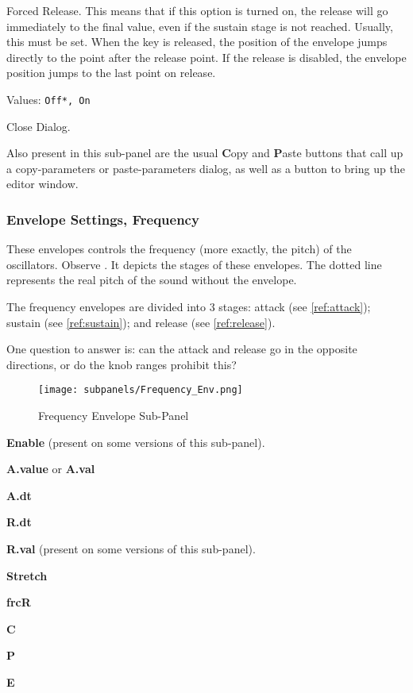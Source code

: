    Forced Release.
   This means that if this option is turned on, the release will go
   immediately to the final value, even if the sustain stage is not reached.
   Usually, this must be set.
   When the key is released, the position of the envelope jumps directly to
   the point after the release point. If the release is disabled, the
   envelope position jumps to the last point on release.

   Values: \texttt{Off*, On}

   Close Dialog.

   Also present in this sub-panel are the usual \textbf{C}opy
   and \textbf{P}aste buttons that call up a copy-parameters or
   paste-parameters dialog, as well as a button
   to bring up the editor window.

\subsubsection{Envelope Settings, Frequency}
\label{subsubsec:envelope_settings_for_frequency}

   These envelopes controls the frequency (more exactly, the pitch) of the
   oscillators.
   Observe .
   It depicts the stages of these envelopes.
   The dotted line represents the real pitch of the sound without the envelope.

   The frequency envelopes are divided into 3 stages:
   attack (see \ref{ref:attack});
   sustain (see \ref{ref:sustain});
   and
   release (see \ref{ref:release}).

   One question to answer is:  
   can the attack and release go in the opposite directions, or do the knob
   ranges prohibit this?

\begin{figure}[H]
   \centering 
   \texttt{[image: subpanels/Frequency\_Env.png]}
   \caption[Frequency Envelope Sub-Panel]{Frequency Envelope Sub-Panel}
   \label{fig:frequency_env}
\end{figure}

   \begin{enumber}
      \item \textbf{Enable} (present on some versions of this sub-panel).
      \item \textbf{A.value} or \textbf{A.val}
      \item \textbf{A.dt}
      \item \textbf{R.dt}
      \item \textbf{R.val} (present on some versions of this sub-panel).
      \item \textbf{Stretch}
      \item \textbf{frcR}
      \item \textbf{C}
      \item \textbf{P}
      \item \textbf{E}
   \end{enumber}

